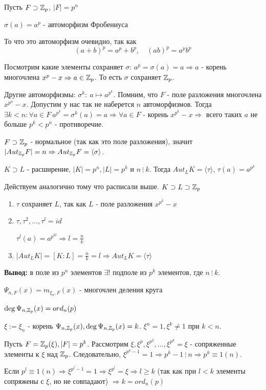 \par Пусть $F \supset \mathbb{Z}_p$, $|F|=p^n$
\par \Def $\sigma(a)=a^p$ - автоморфизм Фробениуса
\par То что это автоморфизм очевидно, так как
$$(a+b)^p=a^p+b^p, \quad (ab)^p=a^pb^p$$
\par Посмотрим какие элементы сохраняет $\sigma$: $a^p=\sigma(a)=a \Rightarrow a$ - корень многочлена $x^p-x \Rightarrow a \in \mathbb{Z}_p$. То есть $\sigma$ сохраняет $\mathbb{Z}_p$.
\par Другие автоморфизмы: $\sigma^k: \: a \mapsto a^{p^k}$. Помним, что $F$ - поле разложения многочлена $x^{p^n}-x$. Допустим у нас так не наберется $n$ автоморфизмов. Тогда $\exists k < n: \forall a \in F \: a^{p^k}=\sigma^k(a)=a \Rightarrow \forall a \in F$ - корень $x^{p^k}-x \Rightarrow$ всего таких $a$ не больше $p^k<p^n$ - противоречие.

\par $F \supset \mathbb{Z}_p$ - нормальное (так как это поле разложения), значит $|Aut_{\mathbb{Z}_p} F|=n \Rightarrow Aut_{\mathbb{Z}_p} F=\langle \sigma \rangle$.

\par \Statement $K \supset L$ - расширение, $|K|=p^n, |L|=p^k$ и $n \: \vdots \: k$. Тогда $Aut_L K=\langle \tau \rangle$, $\tau(a)=a^{p^k}$
\par \Proof Действуем аналогично тому что расписали выше. $K \supset L \supset \mathbb{Z}_p$
\begin{enumerate}
    \item $\tau$ сохраняет $L$, так как $L$ - поле разложения $x^{p^k}-x$
    
    \item $\tau, \tau^2, \ldots, \tau^l=id$
    \par $\tau^l(a)=a^{p^{kl}} \Rightarrow l = \frac{n}{k}$
    
    \item $|Aut_L K|=[K:L]=\frac{n}{k}=l \Rightarrow Aut_L K=\langle \tau \rangle$ \EndProof
\end{enumerate}
\par \textbf{Вывод:} в поле из $p^n$ элементов $\exists !$ подполе из $p^k$ элементов, где $n \: \vdots \: k$.

\par \Def $\Psi_{n, F}(x)=m_{\xi_n,F}(x)$ - многочлен деления круга

\par \Statement $\deg \Psi_{n, \mathbb{Z}_p}(x)=ord_n(p)$
\par \Proof $\xi:=\xi_n$ - корень $\Psi_{n, \mathbb{Z}_p}(x), \deg \Psi_{n, \mathbb{Z}_p}(x)=k$. $\xi^n=1, \xi^k \neq 1$ при $k < n$.
\par Пусть $F=\mathbb{Z}_p(\xi), |F|=p^k$. Рассмотрим $\xi, \xi^p, \xi^{p^2}, \ldots, \xi^{p^k}=\xi$ - сопряженные элементы к $\xi$ над $\mathbb{Z}_p$. Следовательно, $\xi^{p^k-1}=1 \Rightarrow p^k-1 \: \vdots \: n \Rightarrow p^k \equiv 1 (n)$.

\par Если $p^l \equiv 1(n) \Rightarrow \xi^{p^l-1}=1 \Rightarrow \xi^{p^l}=\xi \Rightarrow l \geq k$ (так как при $l<k$ элементы сопряжены с $\xi$, но не совпадают) $\Rightarrow k = ord_n(p)$ \EndProof